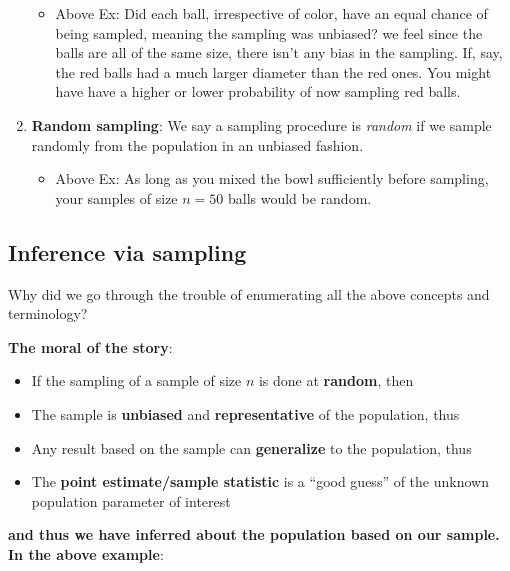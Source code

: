 \documentclass[12pt,]{krantz}
\providecommand{\tightlist}{%
  \setlength{\itemsep}{0pt}\setlength{\parskip}{0pt}}
\renewenvironment{quote}{\begin{VF}}{\end{VF}}
\begin{document}
\begin{enumerate}
  \begin{itemize}
  \tightlist
  \item
    Above Ex: Did each ball, irrespective of color, have an equal chance
    of being sampled, meaning the sampling was unbiased? we feel since
    the balls are all of the same size, there isn't any bias in the
    sampling. If, say, the red balls had a much larger diameter than the
    red ones. You might have have a higher or lower probability of now
    sampling red balls.
  \end{itemize}
\item
  \textbf{Random sampling}: We say a sampling procedure is \emph{random}
  if we sample randomly from the population in an unbiased fashion.

  \begin{itemize}
  \tightlist
  \item
    Above Ex: As long as you mixed the bowl sufficiently before
    sampling, your samples of size \(n=50\) balls would be random.
  \end{itemize}
\end{enumerate}

\subsection*{Inference via sampling}\label{inference-via-sampling}


Why did we go through the trouble of enumerating all the above concepts
and terminology?

\textbf{The moral of the story}:

\begin{quote}
\begin{itemize}
\tightlist
\item
  If the sampling of a sample of size \(n\) is done at \textbf{random},
  then
\item
  The sample is \textbf{unbiased} and \textbf{representative} of the
  population, thus
\item
  Any result based on the sample can \textbf{generalize} to the
  population, thus
\item
  The \textbf{point estimate/sample statistic} is a ``good guess'' of
  the unknown population parameter of interest
\end{itemize}
\end{quote}

\textbf{and thus we have inferred about the population based on our
sample. In the above example}:
\end{document}
